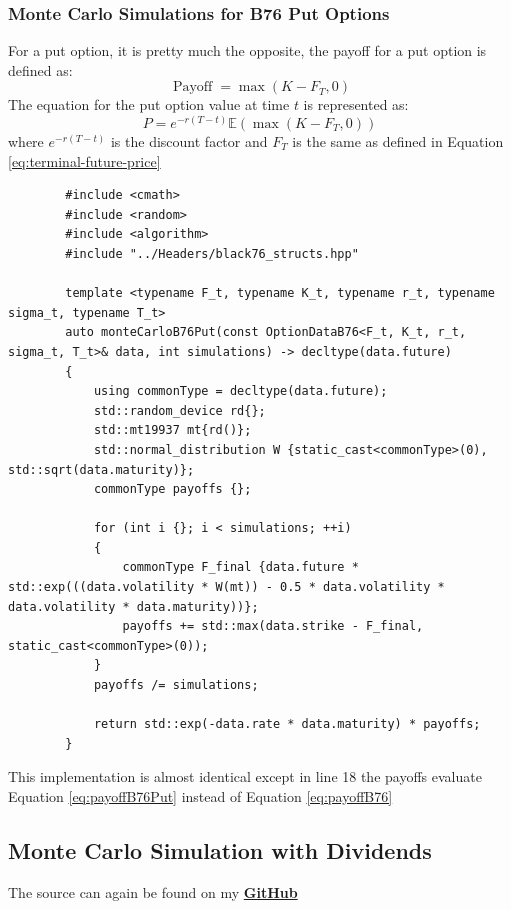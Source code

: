 \documentclass[12pt]{article}
\numberwithin{equation}{section}
\begin{document}
\subsubsection{Monte Carlo Simulations for B76 Put Options}
For a put option, it is pretty much the opposite, the payoff for a put option is defined as:
\begin{equation}
	\operatorname{Payoff} = \max(K - F_T, 0)
	\label{eq:payoffB76Put}
\end{equation}
\newline 
The equation for the put option value at time $t$ is represented as: 
\begin{equation}
	P = e^{-r(T-t)} \mathbb{E}(\max(K-F_T, 0))
	\label{putB76MC}
\end{equation}
where $e^{-r(T-t)}$ is the discount factor and $F_T$ is the same as defined in Equation \ref{eq:terminal-future-price}\\
\begin{listing}[H]
	\begin{verbatim}
		#include <cmath>
		#include <random>
		#include <algorithm>
		#include "../Headers/black76_structs.hpp"

		template <typename F_t, typename K_t, typename r_t, typename sigma_t, typename T_t>
		auto monteCarloB76Put(const OptionDataB76<F_t, K_t, r_t, sigma_t, T_t>& data, int simulations) -> decltype(data.future)
		{
			using commonType = decltype(data.future);
			std::random_device rd{};
			std::mt19937 mt{rd()};
			std::normal_distribution W {static_cast<commonType>(0), std::sqrt(data.maturity)};
			commonType payoffs {};
			
			for (int i {}; i < simulations; ++i)
			{
				commonType F_final {data.future * std::exp(((data.volatility * W(mt)) - 0.5 * data.volatility * data.volatility * data.maturity))};
				payoffs += std::max(data.strike - F_final, static_cast<commonType>(0));
			}
			payoffs /= simulations;
			
			return std::exp(-data.rate * data.maturity) * payoffs;
		}
	\end{verbatim}
	\caption{Black-76 Put using Monte Carlo Simulations}
	\label{lst:b76smontecarloPut}
\end{listing}
This implementation is almost identical except in line 18 the payoffs evaluate Equation \ref{eq:payoffB76Put} instead of Equation \ref{eq:payoffB76} 
\subsection{Monte Carlo Simulation with Dividends}
The source can again be found on my \href{https://github.com/neeldevsen/pricingengines/blob/main/I%3A%20European%20Options/02_Monte_Carlo/2.3_monte_carlo_simulation_merton.cpp}{\textbf{GitHub}}
\end{document}
